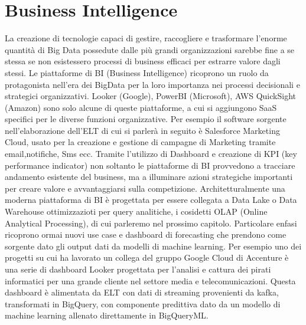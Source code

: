 \documentclass[a4paper,12pt]{report}
\begin{document}
\section{Business Intelligence}
La creazione di tecnologie capaci di gestire, raccogliere e trasformare l'enorme quantità di Big Data possedute dalle più grandi organizzazioni sarebbe fine a se stessa se non esistessero processi di business efficaci per estrarre valore dagli stessi.
Le piattaforme di BI (Business Intelligence) ricoprono un ruolo da protagonista nell'era dei BigData per la loro importanza nei processi decisionali e strategici organizzativi. 
Looker (Google), PowerBI (Microsoft), AWS QuickSight (Amazon) sono solo alcune di queste piattaforme, a cui si aggiungono SaaS specifici per le diverse funzioni organizzative. Per esempio il software sorgente nell'elaborazione dell'ELT di cui si parlerà in seguito è Salesforce Marketing Cloud, usato per la creazione e gestione di campagne di Marketing tramite email,notifiche, Sms ecc.
Tramite l'utilizzo di Dashboard e creazione di KPI (key performance indicator) non soltanto le piattaforme di BI provvedono a tracciare andamento esistente del business, ma a illuminare azioni strategiche importanti per creare valore e avvantaggiarsi sulla competizione.
Architetturalmente una moderna piattaforma di BI è progettata per essere collegata a Data Lake o Data Warehouse ottimizzazioti per query analitiche, i cosidetti OLAP (Online Analytical Processing), di cui parleremo nel prossimo capitolo. Particolare enfasi ricoprono ormai nuovi use case e dashboard di forecasting che prendono come sorgente dato gli output dati da modelli di machine learning. Per esempio uno dei progetti su cui ha lavorato un collega del gruppo Google Cloud di Accenture è una serie di dashboard Looker progettata per l'analisi e cattura dei pirati informatici per una grande cliente nel settore media e telecomunicazioni. Questa dashboard è alimentata da ELT con dati di streaming provenienti da kafka, transformati in BigQuery, con componente predittiva dato da un modello di machine learning allenato direttamente in BigQueryML. 



\end{document}
